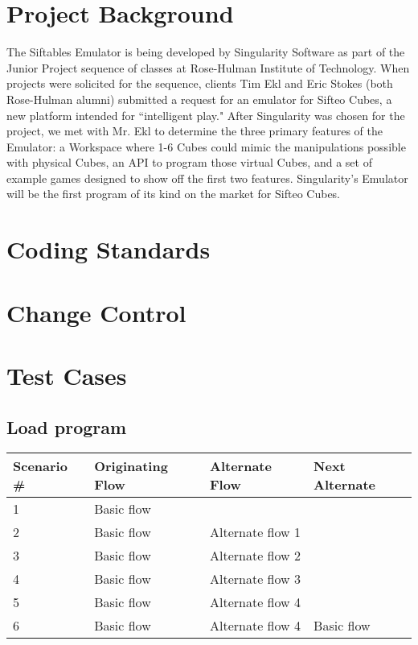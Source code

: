 \documentclass[12pt]{article}
\begin{document}
\section{Project Background}
The Siftables Emulator is being developed by Singularity Software as part of the Junior Project sequence of classes at Rose-Hulman Institute of Technology. When projects were solicited for the sequence, clients Tim Ekl and Eric Stokes (both Rose-Hulman alumni) submitted a request for an emulator for Sifteo Cubes, a new platform intended for ``intelligent play." After Singularity was chosen for the project, we met with Mr. Ekl to determine the three primary features of the Emulator: a Workspace where 1-6 Cubes could mimic the manipulations possible with physical Cubes, an \gls{API} to program those virtual Cubes, and a set of example games designed to show off the first two features. Singularity's Emulator will be the first program of its kind on the market for Sifteo Cubes.

\section{Coding Standards}


\section{Change Control}

\clearpage
\section{Test Cases}

\subsection{Load program}

\begin{table}[h!]
  \begin{tabular}{l | l | l | l}
    \textbf{Scenario \#} &
    \textbf{Originating Flow} &
    \textbf{Alternate Flow} &
    \textbf{Next Alternate} \\ \hline

    1 &
    Basic flow &
    &
    \\ \hline

    2 &
    Basic flow &
    Alternate flow 1 &
    \\ \hline

    3 &
    Basic flow &
    Alternate flow 2 &
    \\ \hline

    4 &
    Basic flow &
    Alternate flow 3 &
    \\ \hline

    5 &
    Basic flow &
    Alternate flow 4 &
    \\ \hline

    6 &
    Basic flow &
    Alternate flow 4 &
    Basic flow \\ \hline

  \end{tabular}
\end{table}
\end{document}
